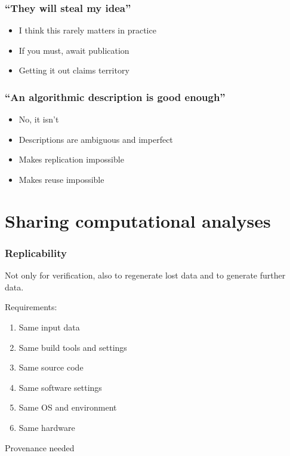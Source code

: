 \documentclass[slidestop]{beamer}
\begin{document}
\begin{frame}
  \frametitle{``They will steal my idea''}
  \pause
  \begin{itemize}
    \item I think this rarely matters in practice
    \item If you must, await publication
    \item Getting it out claims territory %
  \end{itemize}
\end{frame}


\begin{frame}
  \frametitle{``An algorithmic description is good enough''}
  \pause
  \begin{itemize}
    \item No, it isn't
    \item Descriptions are ambiguous and imperfect
    \item Makes replication impossible
    \item Makes reuse impossible
  \end{itemize}
\end{frame}

\section{Sharing computational analyses}

\begin{frame}
  \frametitle{Replicability}
  Not only for verification, also to regenerate lost data and to generate
  further data.

  \vspace{0.5cm}
  \pause

  Requirements:
  \begin{enumerate}
    \item Same input data
    \item Same build tools and settings
    \item Same source code
    \item Same software settings
    \item Same OS and environment
    \item Same hardware
  \end{enumerate}

  \vspace{0.5cm}
  \pause

  Provenance needed
\end{frame}
\end{document}

